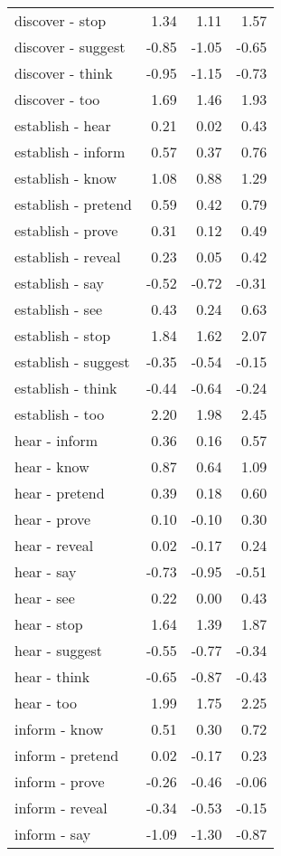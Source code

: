 \begin{longtable}{lrrr}
  discover - stop & 1.34 & 1.11 & 1.57 \\ 
  discover - suggest & -0.85 & -1.05 & -0.65 \\ 
  discover - think & -0.95 & -1.15 & -0.73 \\ 
  discover - too & 1.69 & 1.46 & 1.93 \\ 
  establish - hear & 0.21 & 0.02 & 0.43 \\ 
  establish - inform & 0.57 & 0.37 & 0.76 \\ 
  establish - know & 1.08 & 0.88 & 1.29 \\ 
  establish - pretend & 0.59 & 0.42 & 0.79 \\ 
  establish - prove & 0.31 & 0.12 & 0.49 \\ 
  establish - reveal & 0.23 & 0.05 & 0.42 \\ 
  establish - say & -0.52 & -0.72 & -0.31 \\ 
  establish - see & 0.43 & 0.24 & 0.63 \\ 
  establish - stop & 1.84 & 1.62 & 2.07 \\ 
  establish - suggest & -0.35 & -0.54 & -0.15 \\ 
  establish - think & -0.44 & -0.64 & -0.24 \\ 
  establish - too & 2.20 & 1.98 & 2.45 \\ 
  hear - inform & 0.36 & 0.16 & 0.57 \\ 
  hear - know & 0.87 & 0.64 & 1.09 \\ 
  hear - pretend & 0.39 & 0.18 & 0.60 \\ 
  hear - prove & 0.10 & -0.10 & 0.30 \\ 
  hear - reveal & 0.02 & -0.17 & 0.24 \\ 
  hear - say & -0.73 & -0.95 & -0.51 \\ 
  hear - see & 0.22 & 0.00 & 0.43 \\ 
  hear - stop & 1.64 & 1.39 & 1.87 \\ 
  hear - suggest & -0.55 & -0.77 & -0.34 \\ 
  hear - think & -0.65 & -0.87 & -0.43 \\ 
  hear - too & 1.99 & 1.75 & 2.25 \\ 
  inform - know & 0.51 & 0.30 & 0.72 \\ 
  inform - pretend & 0.02 & -0.17 & 0.23 \\ 
  inform - prove & -0.26 & -0.46 & -0.06 \\ 
  inform - reveal & -0.34 & -0.53 & -0.15 \\ 
  inform - say & -1.09 & -1.30 & -0.87 \\ 

\end{longtable}
